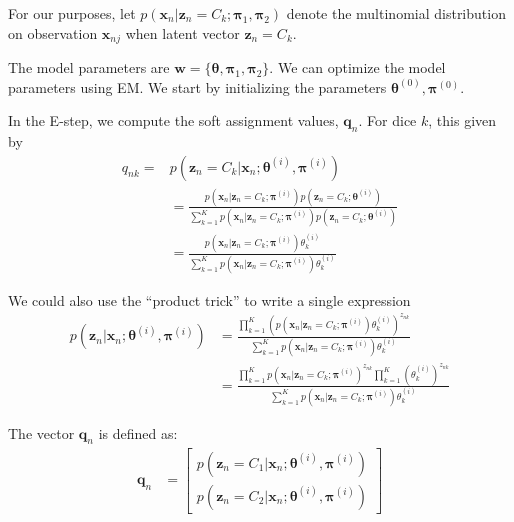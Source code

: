 For our purposes, let $ p(\textbf{x}_n | \textbf{z}_n = C_k; \boldsymbol{\pi}_1, \boldsymbol{\pi}_2)$ denote the
multinomial distribution on observation $\textbf{x}_{nj}$ when latent vector $\textbf{z}_n = C_k$.

%
%
The model parameters are $\textbf{w} = \{\boldsymbol{\theta}, \boldsymbol{\pi}_1, \boldsymbol{\pi}_2 \}$.
We can optimize the model parameters using EM. We start by initializing the parameters $\boldsymbol{\theta}^{(0)}, \boldsymbol{\pi}^{(0)}$.

In the E-step, we compute the soft assignment values, $\textbf{q}_n$. For dice $k$, this given by
%
\begin{align} \label{E-for-multinomial}
q_{nk} = 
&  p(\textbf{z}_n = C_k | \textbf{x}_n; \boldsymbol{\theta}^{(i)}, \boldsymbol{\pi}^{(i)})
\\
&  =
     \frac{  p(\textbf{x}_n | \textbf{z}_n = C_k; \boldsymbol{\pi}^{(i)})p(\textbf{z}_n = C_k; \boldsymbol{\theta}^{(i)})}
     {\sum_{k=1}^K  p(\textbf{x}_n | \textbf{z}_n = C_k; \boldsymbol{\pi}^{(i)})p(\textbf{z}_n = C_k; \boldsymbol{\theta}^{(i)})}
  \\
  &  =
     \frac{  p(\textbf{x}_n | \textbf{z}_n = C_k; \boldsymbol{\pi}^{(i)})\theta_k^{(i)}}
     {\sum_{k=1}^K  p(\textbf{x}_n | \textbf{z}_n = C_k; \boldsymbol{\pi}^{(i)})\theta_k^{(i)}}
\end{align}


We could also use the ``product trick'' to write a single expression
%
\begin{align*}
  p(\textbf{z}_n  | \textbf{x}_n; \boldsymbol{\theta}^{(i)}, \boldsymbol{\pi}^{(i)})& =
 \frac{  \prod_{k=1}^K\left(  p(\textbf{x}_n | \textbf{z}_n = C_k; \boldsymbol{\pi}^{(i)})\theta_k^{(i)}\right) ^{z_{nk}}}
                                                                                      {\sum_{k=1}^K  p(\textbf{x}_n | \textbf{z}_n = C_k; \boldsymbol{\pi}^{(i)})\theta_k^{(i)}}
  \\
  & =
 \frac{  \prod_{k=1}^K p(\textbf{x}_n | \textbf{z}_n = C_k; \boldsymbol{\pi}^{(i)})^{z_{nk}}\prod_{k=1}^K(\theta_k^{(i)})^{z_{nk}}}
                                                                                      {\sum_{k=1}^K  p(\textbf{x}_n | \textbf{z}_n = C_k; \boldsymbol{\pi}^{(i)})\theta_k^{(i)}}
  \end{align*}

The vector $\textbf{q}_n$  is defined as:
%
\begin{align}
  \label{E-for-multinomial}
    \textbf{q}_n &= \begin{bmatrix}
                p(\textbf{z}_n = C_1 | \textbf{x}_n; \boldsymbol{\theta}^{(i)}, \boldsymbol{\pi}^{(i)}) \\
                p(\textbf{z}_n = C_2 | \textbf{x}_n; \boldsymbol{\theta}^{(i)}, \boldsymbol{\pi}^{(i)}) 
            \end{bmatrix} 
\end{align}


